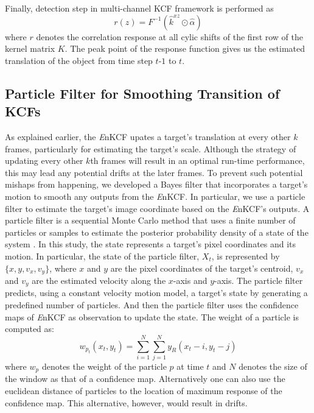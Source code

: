 \documentclass{bmvc2k}
\begin{document}
Finally, detection step in multi-channel KCF framework is performed as
\begin{equation}
r(z) = F^{-1}(\hat{k}^{xz} \odot \hat{\alpha})
\end{equation}
where $r$ denotes the correlation response at all cylic shifts of the
first row of the kernel matrix $K$. The peak point of the response
function gives us the estimated translation of the object from time
step $t$-$1$ to $t$.

\subsection{Particle Filter for Smoothing Transition of KCFs} \label{sc:PF}
As explained earlier, the {\it E}nKCF upates a target's translation at
every other $k$ frames, particularly for estimating the target's
scale. Although the strategy of updating every other $k$th frames will
result in an optimal run-time performance, this may lead any potential
drifts at the later frames. To prevent such potential mishaps from
happening, we developed a Bayes filter that incorporates a target's
motion to smooth any outputs from the {\it E}nKCF. In particular, we
use a particle filter to estimate the target's image coordinate based
on the {\it E}nKCF's outputs. A particle filter is a sequential Monte
Carlo method that uses a finite number of particles or samples to
estimate the posterior probability density of a state of the system
\cite{thrun2005probabilistic}. In this study, the state represents a
target's pixel coordinates and its motion. In particular, the state of
the particle filter, $X_t$, is represented by $\lbrace x, y, v_{x},
v_{y} \rbrace$, where $x$ and $y$ are the pixel coordinates of the
target's centroid, $v_x$ and $v_y$ are the estimated velocity along
the $x$-axis and $y$-axis. The particle filter predicts, using a
constant velocity motion model, a target's state by generating a
predefined number of particles. And then the particle filter uses the
confidence maps of {\it E}nKCF as observation to update the state. The
weight of a particle is computed as:
\begin{equation}
w_{p_{t}}(x_{t},y_{t}) = \sum_{i=1}^{N}\sum_{j=1}^{N} y_{R}(x_{t}-i,y_{t}-j)
\end{equation}
where $w_{p}$ denotes the weight of the particle $p$ at time $t$ and
$N$ denotes the size of the window as that of a confidence
map. Alternatively one can also use the euclidean distance of
particles to the location of maximum response of the confidence
map. This alternative, however, would result in drifts. 
\end{document}
